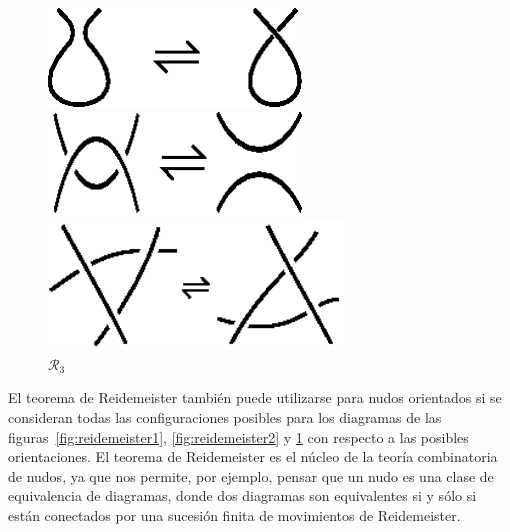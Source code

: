 \documentclass[graybox]{svmult}
\begin{document}
\begin{figure}[ht]
	\centering
    \begin{minipage}{0.3\textwidth}
		\centering
    	\includegraphics[width=0.6\textwidth]{images/reidemeisterI}
		\caption{$\mathcal{R}_1$}
		\label{fig:reidemeister1}
	\end{minipage}
	\begin{minipage}{0.3\textwidth}
		\centering
		\includegraphics[width=0.6\textwidth]{images/reidemeisterII}
		\caption{$\mathcal{R}_2$}
		\label{fig:reidemeister2}
	\end{minipage}
	\begin{minipage}{0.3\textwidth}
		\centering
		\includegraphics[width=0.7\textwidth]{images/reidemeisterIII}
		\caption{$\mathcal{R}_3$}
		\label{fig:reidemeister3}
	\end{minipage}
\end{figure}

El teorema de Reidemeister también puede utilizarse para nudos orientados si se
consideran todas las configuraciones posibles para los diagramas de las
figuras~\ref{fig:reidemeister1}, \ref{fig:reidemeister2} y \ref{fig:reidemeister3} con respecto a las
posibles orientaciones.  El teorema de Reidemeister es el núcleo de la teoría
combinatoria de nudos, ya que nos permite, por ejemplo, pensar que un nudo es
una clase de equivalencia de diagramas, donde dos diagramas son equivalentes si
y sólo si están conectados por una sucesión finita de movimientos de
Reidemeister.
\end{document}
